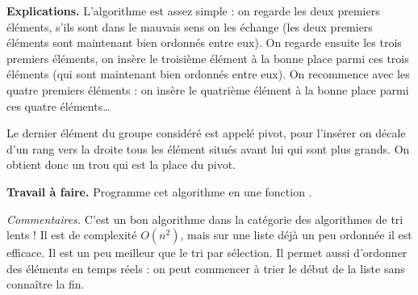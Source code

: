 \documentclass[11pt,class=report,crop=false]{standalone}
\begin{document}
\begin{activite}
\textbf{Explications.}
L'algorithme est assez simple : on regarde les deux premiers éléments, s'ils sont dans le mauvais sens on les échange (les deux premiers éléments sont maintenant bien ordonnés entre eux).
On regarde ensuite les trois premiers éléments, on insère le troisième élément à la bonne place parmi ces trois éléments (qui sont maintenant bien ordonnés entre eux). On recommence avec les quatre premiers éléments : on insère le quatrième élément à la bonne place parmi ces quatre éléments\ldots

Le dernier élément du groupe considéré est appelé pivot,  pour l'insérer on décale d'un rang vers la droite tous les élément situés avant lui qui sont plus grands. On obtient donc un trou qui est la place du pivot.


\bigskip

\textbf{Travail à faire.} Programme cet algorithme en une fonction .

\bigskip

    \emph{Commentaires.}
    C'est un bon algorithme dans la catégorie des algorithmes de tri lents ! Il est de complexité $O(n^2)$, mais sur une liste déjà un peu ordonnée il est efficace. Il est un peu meilleur que le tri par sélection. Il permet aussi d'ordonner des éléments en \og{}temps réels\fg{} : on peut commencer à trier le début de la liste sans connaître la fin. 

\end{activite}




\end{document}
